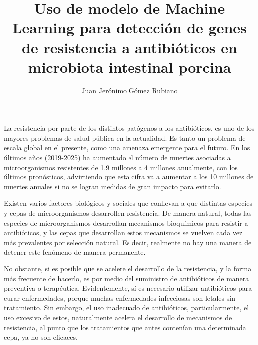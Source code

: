 \documentclass[journal]{vgtc}                     %
\title{Uso de modelo de Machine Learning para detección de genes de resistencia a antibióticos en microbiota intestinal porcina}
\author{ Juan Jerónimo Gómez Rubiano }
\begin{document}


\maketitle

La resistencia por parte de los distintos patógenos a los antibióticos, es uno de los mayores problemas de salud pública en la actualidad. Es tanto un problema de escala global en el presente, como una amenaza emergente para el futuro. En los últimos años (2019-2025) ha aumentado el número de muertes asociadas a microorganismos resistentes de 1.9 millones a 4 millones anualmente, con los últimos pronósticos, advirtiendo que esta cifra va a aumentar a los 10 millones de muertes anuales si no se logran medidas de gran impacto para evitarlo. 

Existen varios factores biológicos y sociales que conllevan a que distintas especies y cepas de microorganismos desarrollen resistencia. De manera natural, todas las especies de microorganismos desarrollan mecanismos bioquímicos para resistir a antibióticos, y las cepas que desarrollan estos mecanismos se vuelven cada vez más prevalentes por selección natural. Es decir, realmente no hay una manera de detener este fenómeno de manera permanente. 

No obstante, si es posible que se acelere el desarrollo de la resistencia, y la forma más frecuente de hacerlo, es por medio del suministro de antibióticos de manera preventiva o terapéutica. Evidentemente, sí es necesario utilizar antibióticos para curar enfermedades, porque muchas enfermedades infecciosas son letales sin tratamiento. Sin embargo, el uso inadecuado de antibióticos, particularmente, el uso excesivo de estos, naturalmente acelera el desarrollo de mecanismos de resistencia, al punto que los tratamientos que antes contenían una determinada cepa, ya no son eficaces. 
\end{document}
